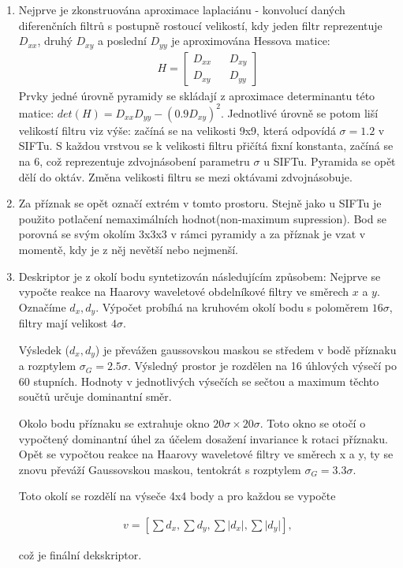 	\begin{enumerate}
		\item Nejprve je zkonstruována aproximace laplaciánu - konvolucí daných diferenčních filtrů s postupně rostoucí velikostí, kdy jeden filtr reprezentuje $D_{xx}$, druhý $D_{xy}$ a poslední $D_{yy}$ je aproximována Hessova matice:
		\begin{align}
			H = \begin{bmatrix}
			D_{xx} && D_{xy} \\ 
			D_{xy} && D_{yy}
			\end{bmatrix}
		\end{align}
		Prvky jedné úrovně pyramidy se skládají z aproximace determinantu této matice: $det(H) = D_{xx}D_{yy} - (0.9D_{xy})^2$. Jednotlivé úrovně se potom liší velikostí filtru viz výše: začíná se na velikosti 9x9, která odpovídá $\sigma = 1.2$ v SIFTu. S každou vrstvou se k velikosti filtru přičítá fixní konstanta, začíná se na 6, což reprezentuje zdvojnásobení parametru $\sigma$ u SIFTu. Pyramida se opět dělí do oktáv. Změna velikosti filtru se mezi oktávami zdvojnásobuje.
			
		\item Za příznak se opět označí extrém v tomto prostoru. Stejně jako u SIFTu je použito potlačení nemaximálních hodnot(non-maximum supression). Bod se porovná se svým okolím 3x3x3 v rámci pyramidy a za příznak je vzat v momentě, kdy je z něj nevětší nebo nejmenší.
		
		\item Deskriptor je z okolí bodu syntetizován následujícím způsobem: Nejprve se vypočte reakce na Haarovy waveletové obdelníkové filtry ve směrech $x$ a $y$. Označíme $d_x, d_y$. Výpočet probíhá na kruhovém okolí bodu s poloměrem $16\sigma$, filtry mají velikost $4\sigma$. 
		
		Výsledek ($d_x, d_y$) je převážen gaussovskou maskou se středem v bodě příznaku a rozptylem $\sigma_{G} = 2.5\sigma{}$. Výsledný prostor je rozdělen na 16 úhlových výsečí po 60 stupních. Hodnoty v jednotlivých výsečích se sečtou a maximum těchto součtů určuje dominantní směr.
		
		Okolo bodu příznaku se extrahuje okno $20\sigma{} \times 20\sigma{}$. Toto okno se otočí o vypočtený dominantní úhel za účelem dosažení invariance k rotaci příznaku. Opět se vypočtou reakce na Haarovy waveletové filtry ve směrech x a y, ty se znovu převáží Gaussovskou maskou, tentokrát s rozptylem $\sigma_G = 3.3\sigma$. 
		
		Toto okolí se rozdělí na výseče 4x4 body a pro každou se vypočte 
		
		\begin{align}
		v = [\sum d_x, \sum d_y, \sum\lvert d_x \rvert, \sum\lvert d_y \rvert ],
		\end{align}
		
		což je finální dekskriptor.
		
	\end{enumerate}
	
